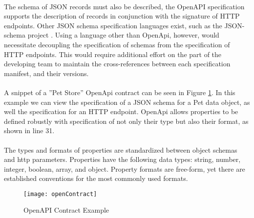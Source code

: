 \paragraph{}

The schema of JSON records must also be described,
the OpenAPI specification supports the description of records
in conjunction with the signature of HTTP endpoints.
Other JSON schema specification languages exist, such as the JSON-schema project \cite{jsonschema}.
Using a language other than OpenApi, however, would necessitate decoupling the specification of schemas from the specification of HTTP endpoints.
This would require additional effort on the part of the developing team to maintain the cross-references
between each specification manifest, and their versions.

\paragraph{}

A snippet of a ''Pet Store'' OpenApi contract can be seen in Figure \ref{fig:open_contract}.
In this example we can view the specification of a JSON schema for a Pet data object,
as well the specification for an HTTP endpoint.
OpenApi allows properties to be defined robustly with specification of not only their type but also their format, as shown in line 31.

\paragraph{}

The types and formats of properties are standardized between object schemas and http parameters.
Properties have the following data types: string, number, integer, boolean, array, and object.
Property formats are free-form, yet there are established conventions for the most commonly used formats.

\begin{figure}[htbp]
    \centering
    \centerline{\texttt{[image: openContract]}}
    \caption{OpenAPI Contract Example}
    \label{fig:open_contract}
\end{figure}

\newpage

